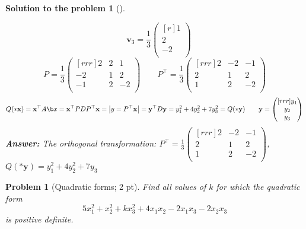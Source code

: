 \documentclass[12pt,a4]{article}
\newtheorem{problem}{Problem}
\newtheorem{solution}{Solution to the problem}
\newcommand{\bv}{{\mathbf v}}
\newcommand{\bx}{{\mathbf x}}
\newcommand{\by}{{\mathbf y}}
\newcommand{\answer}[1]{\textbf{Answer:} #1}
\begin{document}
{\begin{solution}[]
\begin{enumerate}[(a)]
\[\quad
\bv_3 = \frac13
\begin{pmatrix}[r]
1\\ 2\\ -2 \\
\end{pmatrix}
\]
\[
P = \frac13
\begin{pmatrix}[rrr]
2 & 2 & 1\\
-2 & 1 & 2\\
-1 & 2 & -2 \\
\end{pmatrix}
\qquad
P^\top = \frac13
\begin{pmatrix}[rrr]
2 & -2 & -1\\
2 & 1 & 2\\
1 & 2 & -2 \\
\end{pmatrix}
\]
\[
Q(*\bx) = \bx^\top A \b x = \bx^\top P D P^\top \bx = \left | y = P^\top \bx \right | = \by^\top D \by = y_1^2 + 4y_2^2 + 7y_3^2= Q(*\by)
\qquad
\by =
\begin{pmatrix}[rrr]
y_1 \\ y_2 \\ y_3 \\
\end{pmatrix}
\]
\answer{The orthogonal transformation:
$P^\top = \frac13
\begin{pmatrix}[rrr]
2 & -2 & -1\\
2 & 1 & 2\\
1 & 2 & -2 \\
\end{pmatrix}$,
\quad
$Q(*\by)=y_1^2 + 4y_2^2 + 7y_3$
}\\
\end{enumerate}
\end{solution}
}


\begin{problem}[Quadratic forms; 2 pt]\rm
	Find  all values of $k$ for which the quadratic form
	\[
	5x_1^2 + x_2^2 + kx_3^2 + 4x_1x_2 -2x_1x_3 -2x_2x_3
	\]
	is positive definite.
\end{problem}
\end{document}
